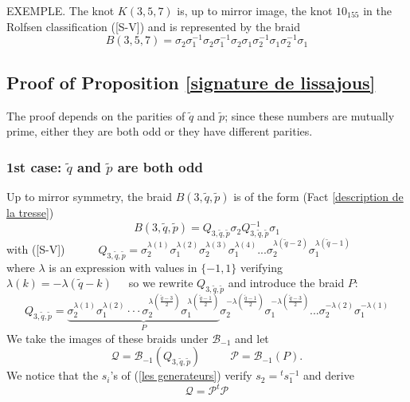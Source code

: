 \documentclass[12pt]{article}
\begin{document}
EXEMPLE. The knot $K(3,5,7)$ is, up to mirror image, the knot $10_{155}$ in the Rolfsen classification ([S-V]) and is represented by the braid \begin{equation} 
B(3,5,7)=\sigma_2\sigma_1^{-1}\sigma_2\sigma_1^{-1}\sigma_2\sigma_1\sigma_2^{-1}\sigma_1\sigma_2^{-1}\sigma_1                 \end{equation} 

\subsection{Proof of Proposition \ref{signature de lissajous}}
The proof depends on the parities of $\tilde{q}$ and $\tilde{p}$; since these numbers are mutually prime, either they are both odd or they have different parities.
\subsubsection{1st case: $\tilde{q}$ and $\tilde{p}$ are both odd}\label{p et q sont impairs}
Up to mirror symmetry, the braid $B(3,\tilde{q},\tilde{p})$ is of the form (Fact \ref{description de la tresse})
 $$B(3,\tilde{q},\tilde{p})=Q_{3,\tilde{q},\tilde{p}}\sigma_2 Q_{3,\tilde{q},\tilde{p}}^{-1}\sigma_1$$ with  ([S-V])\ \ \ \ \ \ $Q_{3,\tilde{q},\tilde{p}}=\sigma_2^{\lambda(1)}\sigma_1^{\lambda(2)}
 \sigma_2^{\lambda(3)}\sigma_1^{\lambda(4)}
 ...
 \sigma_2^{\lambda(\tilde{q}-2)}
 \sigma_1^{\lambda(\tilde{q}-1)}$\\
where $\lambda$ is an expression with values in $\{-1, 1\}$ verifying\\
$\boxed{\lambda(k)=-\lambda(\tilde{q}-k)}$\ \ \ 
so we rewrite $Q_{3,\tilde{q},\tilde{p}}$ and introduce the braid $P$:
\begin{equation}\label{QQ}
Q_{3,\tilde{q},\tilde{p}}=\underbrace{\sigma_2^{\lambda(1)}\sigma_1^{\lambda(2)}\cdot\cdot\cdot
\sigma_2^{\lambda(\frac{\tilde{q}-3}{2})}\sigma_1^{\lambda(\frac{\tilde{q}-1}{2})}}_{P}
\sigma_2^{-\lambda(\frac{\tilde{q}-1}{2})}
\sigma_1^{-\lambda(\frac{\tilde{q}-3}{2})}
...\sigma_2^{-\lambda(2)}\sigma_1^{-\lambda(1)}
\end{equation}
We take the images of these braids under ${ \mathcal B}_{-1}$ and let $${\mathcal Q}={\mathcal B}_{-1}(Q_{3,\tilde{q},\tilde{p}})\ \ \ \ \ \ \ \ \ \ \ \
{\mathcal P}={\mathcal B}_{-1}(P).$$
We notice that the $s_i$'s of (\ref{les generateurs}) verify
$\boxed{s_2={}^{t}s_1^{-1}}$
and derive
\begin{equation}
{\mathcal Q}={\mathcal P}^t{\mathcal P}
\end{equation}
\end{document}
